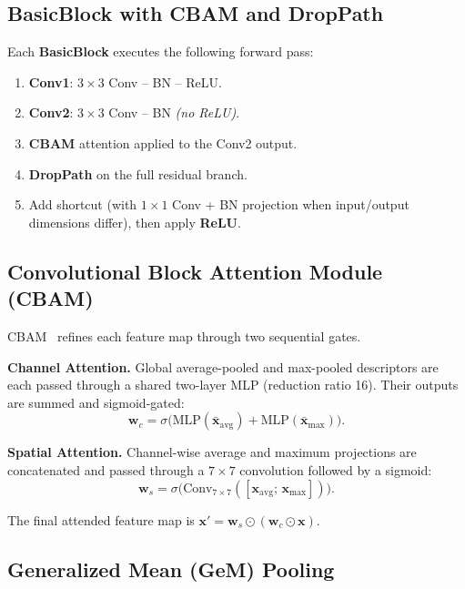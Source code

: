 \documentclass{article}
\theoremstyle{plain}
\theoremstyle{definition}
\theoremstyle{remark}
\begin{document}
\subsection{BasicBlock with CBAM and DropPath}

Each \textbf{BasicBlock} executes the following forward pass:
\begin{enumerate}
  \item \textbf{Conv1}: $3\!\times\!3$ Conv -- BN -- ReLU.
  \item \textbf{Conv2}: $3\!\times\!3$ Conv -- BN \emph{(no ReLU)}.
  \item \textbf{CBAM} attention applied to the Conv2 output.
  \item \textbf{DropPath} on the full residual branch.
  \item Add shortcut (with $1\!\times\!1$ Conv + BN projection when
        input/output dimensions differ), then apply \textbf{ReLU}.
\end{enumerate}

\subsection{Convolutional Block Attention Module (CBAM)}

CBAM~\cite{Woo2018} refines each feature map through two sequential
gates.

\textbf{Channel Attention.} Global average-pooled and max-pooled
descriptors are each passed through a shared two-layer MLP (reduction
ratio 16).  Their outputs are summed and sigmoid-gated:
\begin{equation}
  \mathbf{w}_c = \sigma\!\bigl(
    \mathrm{MLP}(\bar{\mathbf{x}}_{\mathrm{avg}})
    + \mathrm{MLP}(\bar{\mathbf{x}}_{\mathrm{max}})\bigr).
\end{equation}

\textbf{Spatial Attention.} Channel-wise average and maximum
projections are concatenated and passed through a $7\!\times\!7$
convolution followed by a sigmoid:
\begin{equation}
  \mathbf{w}_s = \sigma\!\bigl(
    \mathrm{Conv}_{7\times 7}(
    [\mathbf{x}_{\mathrm{avg}};\,\mathbf{x}_{\mathrm{max}}])\bigr).
\end{equation}

The final attended feature map is
$\mathbf{x}' = \mathbf{w}_s \odot (\mathbf{w}_c \odot \mathbf{x})$.

\subsection{Generalized Mean (GeM) Pooling}
\end{document}
